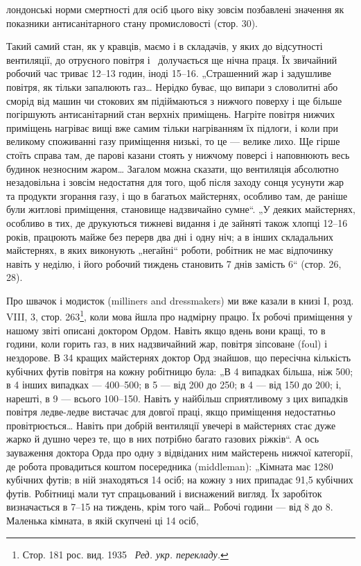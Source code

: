 \parcont{}  %
лондонські норми смертності для осіб цього віку зовсім позбавлені значення як показники
антисанітарного стану промисловості (стор. 30).

Такий самий стан, як у кравців, маємо і в складачів, у яких
до відсутності вентиляції, до отруєного повітря і~ долучається ще нічна праця. Їх звичайний
робочий час триває
12--13 годин, іноді 15--16. „Страшенний жар і задушливе повітря, як тільки запалюють газ\dots{} Нерідко
буває, що випари
з словолитні або сморід від машин чи стокових ям підіймаються
з нижчого поверху і ще більше погіршують антисанітарний стан
верхніх приміщень. Нагріте повітря нижчих приміщень нагріває
вищі вже самим тільки нагріванням їх підлоги, і коли при великому споживанні газу приміщення низькі,
то це — велике лихо.
Ще гірше стоїть справа там, де парові казани стоять у нижчому
поверсі і наповнюють весь будинок незносним жаром\dots{} Загалом можна сказати, що вентиляція абсолютно
незадовільна
і зовсім недостатня для того, щоб після заходу сонця усунути
жар та продукти згорання газу, і що в багатьох майстернях,
особливо там, де раніше були житлові приміщення, становище
надзвичайно сумне“. „У деяких майстернях, особливо в тих,
де друкуються тижневі видання і де зайняті також хлопці 12--16 років, працюють майже без перерв два
дні і одну ніч; а в інших складальних майстернях, в яких виконують „негайні“ роботи,
робітник не має відпочинку навіть у неділю, і його робочий
тиждень становить 7 днів замість 6“ (стор. 26, 28).

Про швачок і модисток (milliners and dressmakers) ми вже
казали в книзі І, розд. VIII, 3, стор. 263\footnote*{Стор. 181 рос. вид. 1935~ \emph{Ред. укр. перекладу.}}, коли мова йшла про
надмірну працю. Їх робочі приміщення у нашому звіті описані
доктором Ордом. Навіть якщо вдень вони кращі, то в години,
коли горить газ, в них надзвичайний жар, повітря зіпсоване (foul)
і нездорове. В 34 кращих майстернях доктор Орд знайшов, що
пересічна кількість кубічних футів повітря на кожну робітницю була: „В 4 випадках більша, ніж 500; в
4 інших випадках —
400--500; в 5 — від 200 до 250; в 4 — від 150 до 200; і, нарешті,
в 9 — всього 100--150. Навіть у найбільш сприятливому з цих
випадків повітря ледве-ледве вистачає для довгої праці, якщо
приміщення недостатньо провітрюється\dots{} Навіть при добрій вентиляції увечері в майстернях стає дуже
жарко й душно через
те, що в них потрібно багато газових ріжків“. А ось зауваження
доктора Орда про одну з відвіданих ним майстерень нижчої
категорії, де робота провадиться коштом посередника (middleman):
„Кімната має 1280 кубічних футів; в ній знаходяться
14 осіб; на кожну з них припадає 91,5 кубічних футів. Робітниці мали тут спрацьований і виснажений
вигляд. Їх заробіток
визначається в 7--15 на тиждень, крім того чай\dots{} Робочі
години — від 8 до 8. Маленька кімната, в якій скупчені ці 14 осіб,
\parbreak{}  %
